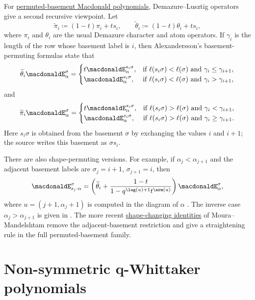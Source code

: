 For \hyperref[macdonaldEperm]{permuted-basement Macdonald polynomials},
Demazure--Lusztig operators give a second recursive viewpoint.  Let
\[
\widetilde{\pi}_i\coloneqq (1-t)\pi_i+t s_i,\qquad
\widetilde{\theta}_i\coloneqq (1-t)\theta_i+t s_i,
\]
where $\pi_i$ and $\theta_i$ are the usual Demazure character and atom
operators.  If $\gamma_i$ is the length of the row whose basement label is
$i$, then Alexandersson's basement-permuting formulas state
\cite[Prop.~15]{Alexandersson2015gbMacdonald} that
\[
\widetilde{\theta}_i\macdonaldE^\sigma_\alpha
 =
\begin{cases}
t\macdonaldE^{s_i\sigma}_\alpha, & \text{if } \ell(s_i\sigma)<\ell(\sigma)
   \text{ and } \gamma_i\leq\gamma_{i+1},\\
\macdonaldE^{s_i\sigma}_\alpha, & \text{if } \ell(s_i\sigma)<\ell(\sigma)
   \text{ and } \gamma_i>\gamma_{i+1},
\end{cases}
\]
and
\[
\widetilde{\pi}_i\macdonaldE^\sigma_\alpha
 =
\begin{cases}
t\macdonaldE^{s_i\sigma}_\alpha, & \text{if } \ell(s_i\sigma)>\ell(\sigma)
   \text{ and } \gamma_i<\gamma_{i+1},\\
\macdonaldE^{s_i\sigma}_\alpha, & \text{if } \ell(s_i\sigma)>\ell(\sigma)
   \text{ and } \gamma_i\geq\gamma_{i+1}.
\end{cases}
\]
Here $s_i\sigma$ is obtained from the basement $\sigma$ by exchanging the
values $i$ and $i+1$; the source writes this basement as $\sigma s_i$.

There are also shape-permuting versions.  For example, if
$\alpha_j<\alpha_{j+1}$ and the adjacent basement labels are
$\sigma_j=i+1$, $\sigma_{j+1}=i$, then
\[
\macdonaldE^\sigma_{s_j\cdot\alpha}
  =
  \left(
    \widetilde{\theta}_i+
    \frac{1-t}{1-q^{\leg(u)+1}t^{\arm(u)}}
  \right)\macdonaldE^\sigma_\alpha,
\]
where $u=(j+1,\alpha_j+1)$ is computed in the diagram of
$\alpha$ \cite[Prop.~17]{Alexandersson2015gbMacdonald}.
The inverse case $\alpha_j>\alpha_{j+1}$ is given in
\cite[Prop.~18]{Alexandersson2015gbMacdonald}.  The more recent
\hyperref[macdonaldEPermShape]{shape-changing identities} of
Moura--Mandelshtam remove the adjacent-basement restriction and give a
straightening rule in the full permuted-basement family.


\section[macdonaldEspec]{Non-symmetric q-Whittaker polynomials}

